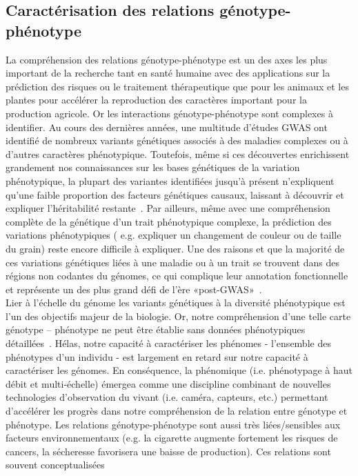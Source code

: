 \subsection{Caractérisation des relations génotype-phénotype}
 La compréhension des relations génotype-phénotype est un des axes les plus important de la recherche tant en santé humaine avec des applications sur la prédiction des risques ou le traitement thérapeutique que pour les animaux et les plantes pour accélérer la reproduction des caractères important pour la production agricole. Or les interactions génotype-phénotype sont complexes à identifier. Au cours des dernières années, une multitude d'études GWAS ont identifié de nombreux variants génétiques associés à des maladies complexes ou à d'autres caractères phénotypique. Toutefois, même si ces découvertes enrichissent grandement nos connaissances sur les bases génétiques de la variation phénotypique, la plupart des variantes identifiées jusqu’à présent n’expliquent qu'une faible proportion des facteurs génétiques causaux, laissant à découvrir et expliquer l'héritabilité restante~\cite{manolio2009}. Par ailleurs, même avec une compréhension complète de la génétique d'un trait phénotypique complexe, la prédiction des variations phénotypiques ( e.g. expliquer un changement de couleur ou de taille du grain) reste encore difficile à expliquer. Une des raisons et que la majorité de ces variations génétiques liées à une maladie ou à un trait se trouvent dans des régions non codantes du génomes, ce qui complique leur annotation fonctionnelle et représente un des plus grand défi de l’ère «post-GWAS»~\cite{freedman2011,Hou2013a}.\\
 
 Lier à l'échelle du génome les variants génétiques à la diversité phénotypique est l’un des objectifs majeur de la biologie. Or, notre compréhension d'une telle carte génotype – phénotype ne peut être établie sans données phénotypiques détaillées~\cite{houle2010}. Hélas, notre capacité à caractériser les phénomes - l'ensemble des phénotypes d'un individu - est largement en retard sur notre capacité à caractériser les génomes. En conséquence, la phénomique (i.e. phénotypage à haut débit et multi-échelle) émergea comme une discipline combinant de nouvelles technologies d'observation du vivant (i.e. caméra, capteurs, etc.) permettant d’accélérer les progrès dans notre compréhension de la relation entre génotype et phénotype.
 Les relations génotype-phénotype sont aussi très liées/sensibles aux facteurs environnementaux (e.g. la cigarette augmente fortement les risques de cancers, la sécheresse favorisera une baisse de production). Ces relations sont souvent conceptualisées \\ 


